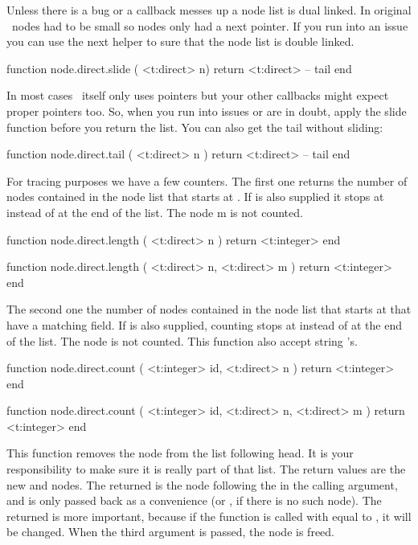 \stopsubsection

\startsubsection[title={Manipulating lists}]

Unless there is a bug or a callback messes up a node list is dual linked. In original
\TEX\ nodes had to be small so nodes only had a next pointer. If you run into an issue
you can use the next helper to sure that the node list is double linked.

\starttyping[option=LUA]
function node.direct.slide ( <t:direct> n)
    return <t:direct> -- tail
end
\stoptyping

In most cases \TEX\ itself only uses  pointers but your other
callbacks might expect proper  pointers too. So, when you run into
issues or are in doubt, apply the slide function before you return the list. You
can also get the tail without sliding:

\starttyping[option=LUA]
function node.direct.tail ( <t:direct> n )
    return <t:direct> -- tail
end
\stoptyping

For tracing purposes we have a few counters. The first one returns the number of
nodes contained in the node list that starts at . If  is also
supplied it stops at  instead of at the end of the list. The node \type
{m} is not counted.

\starttyping[option=LUA]
function node.direct.length (
    <t:direct> n
)
    return <t:integer>
end

function node.direct.length (
    <t:direct> n,
    <t:direct> m
)
    return <t:integer>
end
\stoptyping

The second one the number of nodes contained in the node list that starts at
 that have a matching  field. If  is also supplied,
counting stops at  instead of at the end of the list. The node 
is not counted. This function also accept string 's.

\starttyping[option=LUA]
function node.direct.count (
    <t:integer> id,
    <t:direct>  n
)
    return <t:integer>
end

function node.direct.count (
    <t:integer> id,
    <t:direct>  n,
    <t:direct>  m
)
    return <t:integer>
end
\stoptyping

This function removes the node  from the list following \type
{head}. It is your responsibility to make sure it is really part of that list.
The return values are the new  and  nodes. The
returned  is the node following the  in the calling
argument, and is only passed back as a convenience (or , if there is
no such node). The returned  is more important, because if the
function is called with  equal to , it will be
changed. When the third argument is passed, the node is freed.

